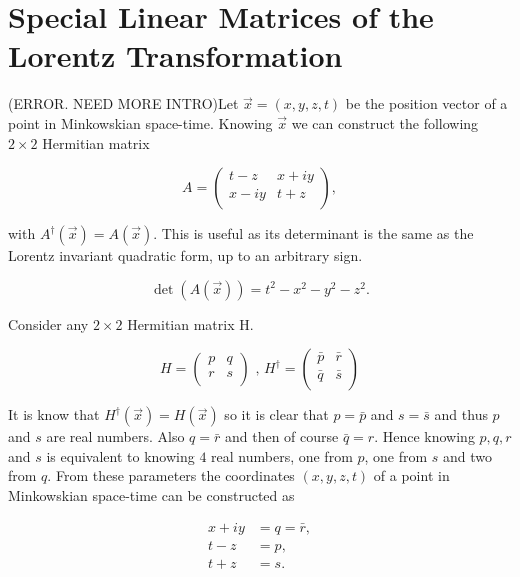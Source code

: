 \section{Special Linear Matrices of the Lorentz Transformation}\label{Special_Linear_Matrices_of_Lorentz}

(ERROR. NEED MORE INTRO)Let $\vec{x} = (x,y,z,t)$ be the position vector of a point in Minkowskian space-time. Knowing $\vec{x}$ we can construct the following $2 \times 2$ Hermitian matrix

\begin{equation}\label{Special_Matrices_A_first}
A = 
\left( 
\begin{array}{cc}
t-z    & x + i y \\
x - iy & t+z \\
\end{array} 
\right),
\end{equation}

\noindent with $A^{\dagger}(\vec{x}) = A(\vec{x})$. This is useful as its determinant is the same as the Lorentz invariant quadratic form, up to an arbitrary sign.

\begin{equation*}
\det(A(\vec{x})) = t^2 - x^2 - y^2 - z^2.
\end{equation*}

Consider any $2 \times 2$ Hermitian matrix H. 

\begin{equation*}
H = \left( \begin{array}{cc}
p & q \\
r & s \\
\end{array} \right) \text{ ,     }
H^{\dagger} = \left( \begin{array}{cc}
\bar{p} & \bar{r} \\
\bar{q} & \bar{s} \\
\end{array} \right)
\end{equation*}

\noindent It is know that $H^{\dagger}(\vec{x}) = H(\vec{x})$ so it is clear that $p = \bar{p}$ and $s = \bar{s}$ and thus $p$ and $s$ are real numbers. Also $q = \bar{r}$ and then of course $\bar{q} = r$. Hence knowing $p,q,r$ and $s$ is equivalent to knowing $4$ real numbers, one from $p$, one from $s$ and two from $q$. From these parameters the coordinates $(x,y,z,t)$ of a point in Minkowskian space-time can be constructed as

\begin{align*}
x + iy & = q = \bar{r}, \\
t - z & = p, \\
t+z  & = s.
\end{align*}

